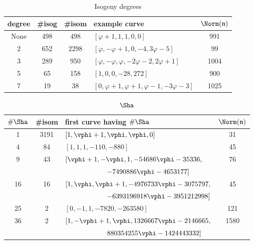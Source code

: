\documentclass{amsart}
\newcommand{\n}{\mathfrak{n}}
\begin{document}
\begin{center}
\begin{table}[h]
\caption{Isogeny degrees\label{table:degree}}
\begin{tabular}{|c|c|c|l|c|}\hline
\textbf{degree} & \textbf{\#isog} & \textbf{\#isom} & \textbf{example curve} & $\Norm(\n)$ \\\hline
None & 498 & 498  & $[\varphi+1,1,1,0,0]$ & 991 \\\hline
2    & 652 & 2298 & $[\varphi,-\varphi+1,0,-4,3\varphi-5]$ & 99\\\hline
3    & 289 & 950  & $[\varphi,-\varphi,\varphi,-2\varphi-2,2\varphi+1]$ & 1004\\\hline
5    & 65  & 158  & $[1,0,0,-28,272]$ & 900 \\\hline
7    & 19  & 38   & $[0,\varphi+1,\varphi+1,\varphi-1,-3\varphi-3]$ & 1025\\\hline
\end{tabular}
\end{table}
\end{center}

\begin{center}
\begin{table}[h]
\caption{$\Sha$\label{table:sha}}
\begin{tabular}{|c|c|l|c|}
\hline 
$\#\Sha$ & \textbf{\#isom} & \textbf{first curve having $\#\Sha$}& $\Norm(\n)$ \\
\hline 
1  & 3191 & $[1,\vphi+1,\vphi,\vphi,0]$ & 31 \\\hline 
4  & 84   & $[1, 1, 1, -110, -880]$ & 45 \\\hline 
\multirow{2}{*}{9}  & \multirow{2}{*}{43}   & $[\vphi+1,-\vphi,1,-54686\vphi-35336,$& \multirow{2}{*}{76} \\
  & & $\qquad\qquad\qquad -7490886\vphi-4653177]$ & \\\hline 
\multirow{2}{*}{16} & \multirow{2}{*}{16}   & $[1,\vphi,\vphi+1,-4976733\vphi-3075797,$& \multirow{2}{*}{45} \\
  & & $\qquad\qquad\qquad -6393196918\vphi-3951212998]$ & \\\hline 
25 & 2    & $[0, -1, 1, -7820, -263580]$ & 121 \\\hline 
\multirow{2}{*}{36} & \multirow{2}{*}{2}    & $[1,-\vphi+1,\vphi,1326667\vphi-2146665,$ & \multirow{2}{*}{1580} \\
  & & $\qquad\qquad\qquad880354255\vphi-1424443332]$ & \\
\hline
\end{tabular}
\end{table}
\end{center}
\end{document}
